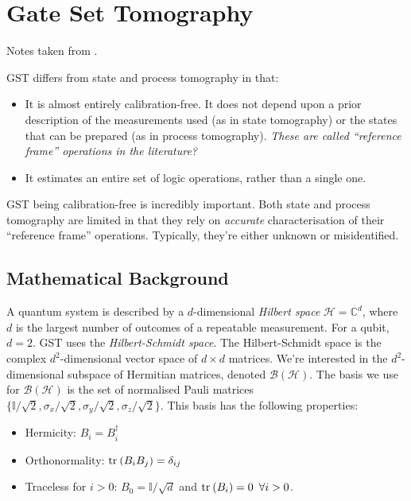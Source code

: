 \section{Gate Set Tomography}

Notes taken from \cite{nielsen_gate_2020}.

\noindent \ac{GST} differs from state and process tomography in that:
\begin{itemize}
    \item It is almost entirely calibration-free. It does not depend upon a prior description of the
    measurements used (as in state tomography) or the states that can be prepared (as in process
    tomography). \textit{These are called ``reference frame'' operations in the literature?}
    \item It estimates an entire set of logic operations, rather than a single one.
\end{itemize}

\ac{GST} being calibration-free is incredibly important. Both state and process tomography are
limited in that they rely on \textit{accurate} characterisation of their ``reference frame''
operations. Typically, they're either unknown or misidentified.

\subsection{Mathematical Background}


A quantum system is described by a $d$-dimensional \textit{Hilbert space} $\mathcal{H} =
\mathbb{C}^d$, where $d$ is the largest number of outcomes of a repeatable measurement. For a qubit,
$d = 2$. GST uses the \textit{Hilbert-Schmidt space}. The Hilbert-Schmidt space is the complex
$d^2$-dimensional vector space of $d \times d$ matrices. We're interested in the $d^2$-dimensional
subspace of Hermitian matrices, denoted $\mathcal{B(H)}$. The basis we use for $\mathcal{B(H)}$ is
the set of normalised Pauli matrices $\{ \mathbb{I} / \sqrt{2}, \sigma_x / \sqrt{2}, \sigma_y /
\sqrt{2}, \sigma_z / \sqrt{2} \}$. This basis has the following properties:
\begin{itemize}
    \item Hermicity: $B_i = B_i^{\dagger}$
    \item Orthonormality: $\text{tr}_{}\left(B_i B_j\right) = \delta_{ij}$
    \item Traceless for $i > 0$: $B_0 = \mathbb{I} / \sqrt{d}$ and $\text{tr}_{}\left(B_i\right) = 0 \enspace \forall{i}
    > 0$.
\end{itemize}

